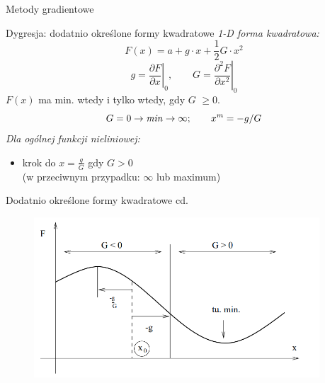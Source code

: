   \begin{frame}{Metody gradientowe}

    \begin{block}{Dygresja: dodatnio określone formy kwadratowe}
      \emph{1-D forma kwadratowa:}
	  \begin{equation}
	  	F(x) = a + g \cdot x + \frac{1}{2} G \cdot x^2
      \nonumber
	  \end{equation}
    \begin{equation}
      g = \left.\frac{\partial F}{\partial x}\right|_{0}{,}\qquad
      G = \left.\frac{\partial^{2} F}{\partial x^2}\right|_{0}
      \nonumber
    \end{equation}
	  $F(x)$ ma min. wtedy i tylko wtedy, gdy $G$ $\geq 0$.
    \begin{equation}
	  		G = 0 \rightarrow \text{\emph{min}} \rightarrow \infty; \qquad
        x^m = -g/G
        \nonumber
	  \end{equation}
	  \emph{Dla ogólnej funkcji nieliniowej:}
	  \smallskip
	  \begin{itemize}
	  	    \item krok do $x = \frac{g}{G}$ gdy $G > 0$
	  	    \\(w przeciwnym przypadku: $\infty$ lub maximum)
	  \end{itemize}
	\end{block}

  \end{frame}

  \begin{frame}{Dodatnio określone formy kwadratowe cd.}

    \begin{figure}
		\centering
		\includegraphics[width=0.95\textwidth]{img/17/dygresja}
	\end{figure}

  \end{frame}

